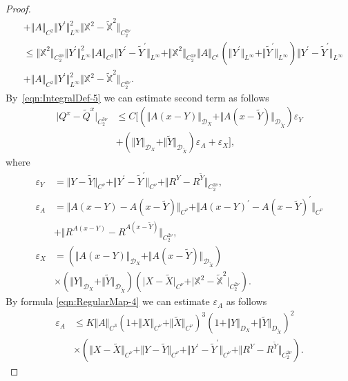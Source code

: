\documentclass[11pt,a4paper,reqno]{amsart}%
\theoremstyle{plain}
\theoremstyle{remark}
\theoremstyle{plain}
\numberwithin{equation}{section}
\newcommand{\eps}{\varepsilon}
\begin{document}
\begin{proof}
\begin{equation}
\begin{split}
&+ \Vert A\Vert_{C^2}\Vert Y^\prime\Vert_{L^{\infty}}^2\Vert \mathbb{X}^2-\mathbb{\tilde{X}}^2\Vert_{C_2^{2\nu}}\\
&\leq
\Vert \mathbb{X}^2\Vert_{C_2^{2\nu}}\Vert Y^\prime\Vert_{L^{\infty}}^2\Vert A\Vert_{C^2}\Vert Y^\prime-\tilde{Y}^\prime\Vert_{L^{\infty}}
+\Vert \mathbb{X}^2\Vert_{C_2^{2\nu}}\Vert A\Vert_{C^1}(\Vert Y^\prime\Vert_{L^{\infty}}+\Vert \tilde{Y}^\prime\Vert_{L^{\infty}})\Vert Y^\prime-\tilde{Y}^\prime\Vert_{L^{\infty}}\\
&+\Vert A\Vert_{C^2}\Vert Y^\prime\Vert_{L^{\infty}}^2\Vert \mathbb{X}^2-\mathbb{\tilde{X}}^2\Vert_{C_2^{2\nu}}.
\end{split}
\end{equation}
By~\eqref{eqn:IntegralDef-5} we can estimate second term as
follows
\begin{equation}
\label{eqn:PRaux-3}
\begin{aligned}
\vert Q^x-\tilde{Q}^x\vert_{C_2^{3\nu}}&\leq
C\Big[(\Vert A(x-Y)\Vert_{\mathcal{D}_X}+\Vert A(x-\tilde{Y})\Vert_{\mathcal{D}_{\tilde{X}}})\eps_Y\nonumber\\&+
(\Vert Y\Vert_{\mathcal{D}_X}+\Vert \tilde{Y}\Vert_{\mathcal{D}_{\tilde{X}}})\eps_A+\eps_X\Big],
\end{aligned}
\end{equation}
where
\begin{align*}
\eps_Y&=\Vert Y-\tilde{Y}\Vert_{C^{\nu}}+\Vert Y^\prime-\tilde{Y}^\prime\Vert_{C^{\nu}}+\Vert R^Y-R^{\tilde{Y}}\Vert_{C_2^{2\nu}},\\
\eps_A&=\Vert A(x-Y)-A(x-\tilde{Y})\Vert_{C^{\nu}}+\Vert A(x-Y)^\prime-A(x-\tilde{Y})^\prime\Vert_{C^{\nu}}\\
&+\Vert R^{A(x-Y)}-R^{A(x-\tilde{Y})}\Vert_{C_2^{2\nu}},\\
\eps_X&=(\Vert A(x-Y)\Vert_{\mathcal{D}_X}+\Vert A(x-\tilde{Y})\Vert_{\mathcal{D}_{\tilde{X}}})\\
&\times(\Vert Y\Vert_{\mathcal{D}_X}+\Vert \tilde{Y}\Vert_{\mathcal{D}_{\tilde{X}}})
(\vert X-\tilde{X}\vert_{C^{\nu}}+\vert \mathbb{X}^2-\mathbb{\tilde{X}}^2\vert_{C_2^{2\nu}}).
\end{align*}
By formula \eqref{eqn:RegularMap-4} we can estimate $\eps_A$ as
follows
\begin{align}
 \eps_A &\leq
K\Vert A\Vert_{C^3}(1+\Vert X\Vert_{C^{\nu}}+\Vert \tilde{X}\Vert_{C^{\nu}})^3(1+\Vert Y\Vert_{D_X}+\Vert \tilde{Y}\Vert_{D_{\tilde{X}}})^2\nonumber\\
&\times(\Vert X-\tilde{X}\Vert_{C^{\nu}}+\Vert Y-\tilde{Y}\Vert_{C^{\nu}}+\Vert Y^\prime-\tilde{Y}^\prime\Vert_{C^{\nu}}+\Vert R^Y-R^{\tilde{Y}}\Vert_{C_2^{2\nu}}).\label{eqn:PRaux-4}

\end{align}
\end{proof}
\end{document}
